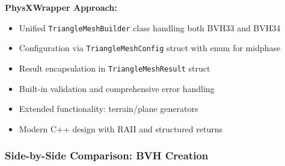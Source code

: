 \textbf{PhysXWrapper Approach:}
\begin{itemize}
    \item Unified \texttt{TriangleMeshBuilder} class handling both BVH33 and BVH34
    \item Configuration via \texttt{TriangleMeshConfig} struct with enum for midphase
    \item Result encapsulation in \texttt{TriangleMeshResult} struct
    \item Built-in validation and comprehensive error handling
    \item Extended functionality: terrain/plane generators
    \item Modern C++ design with RAII and structured returns
\end{itemize}

\subsubsection{Side-by-Side Comparison: BVH Creation}

